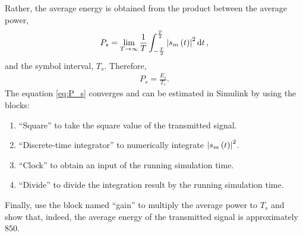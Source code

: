 \documentclass[12pt,a4paper]{article}
\begin{document}
Rather, the average energy is obtained from the product between the average power,
\begin{align}
    \label{eq:P_s}
    P_s = \lim_{T \rightarrow \infty} \frac{1}{T} \int_{-\frac{T}{2}}^{\frac{T}{2}} \abs{s_m \left( t \right)}^{2} \dd{t},
\end{align}
and the symbol interval, \(T_s\). Therefore,
\begin{align}
    P_s = \frac{E_s}{T_s}.
\end{align}
The equation \eqref{eq:P_s} converges and can be estimated in Simulink by using the blocks:
\begin{enumerate}
    \item ``Square'' to take the square value of the transmitted signal.
    \item ``Discrete-time integrator'' to numerically integrate \(\abs{s_m \left( t \right)}^{2}\).
    \item ``Clock'' to obtain an input of the running simulation time.
    \item ``Divide'' to divide the integration result by the running simulation time.
\end{enumerate}

Finally, use the block named ``gain'' to multiply the average power to \(T_s\) and show that, indeed, the average energy of the transmitted signal is approximately \(850\).

\printbibliography
\end{document}
